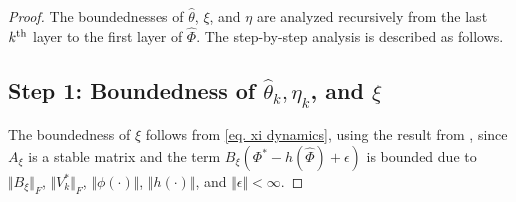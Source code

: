 \documentclass[lettersize,journal]{IEEEtran}
\begin{document}
\begin{proof}

The boundednesses of $\hat\theta$, $\xi$, and $\eta$ are analyzed recursively from the last $k\textsuperscript{th}$ layer to the first layer of $\hat\Phi$. The step-by-step analysis is described as follows.

\subsection*{Step 1: Boundedness of $\hat\theta_k,\eta_k$, and $\xi$}


The boundedness of $\xi$ follows from \eqref{eq. xi dynamics}, using the result from \cite[Chap.~4 T.~1.9]{RN13}, since $A_\xi$ is a stable matrix and the term $B_\xi (\Phi^*-h(\hat\Phi)+\epsilon)$ is bounded due to $\Vert B_\xi\Vert_F$, $\Vert V_k^*\Vert_F$, $\Vert \phi(\cdot)\Vert$, $\Vert h(\cdot)\Vert$, and $\Vert\epsilon\Vert <\infty$.



\end{proof}
\end{document}

